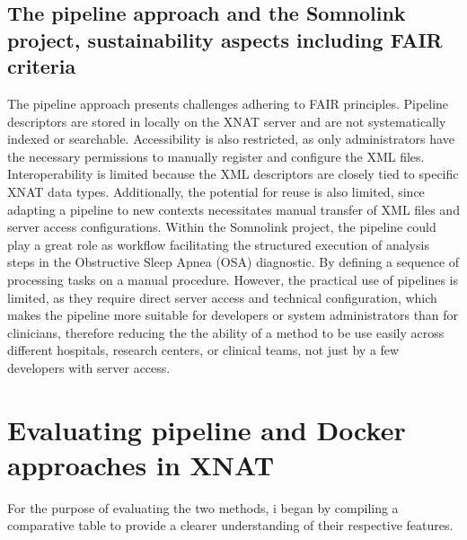 \subsection{The pipeline approach and the Somnolink project, sustainability aspects including FAIR criteria}
The pipeline approach presents challenges adhering to FAIR principles.
Pipeline descriptors are stored in locally on the XNAT server and are not systematically indexed or searchable.
 Accessibility is also restricted, as only administrators have the necessary permissions to manually register and configure the XML files.
 Interoperability is limited because the XML descriptors are closely tied to specific XNAT data types. Additionally, the potential for reuse is also limited, since adapting a pipeline to new contexts necessitates manual transfer of XML files and server access configurations. Within the Somnolink project, the pipeline could play a great role as workflow  facilitating the structured execution of analysis steps in the Obstructive Sleep Apnea (OSA) diagnostic. By defining a sequence of processing tasks on a manual procedure. However, the practical use of pipelines is limited, as they require direct server access and technical configuration, which makes the pipeline more suitable for developers or system administrators than for clinicians, therefore reducing the the ability of a method to be use easily across different hospitals, research centers, or clinical teams, not just by a few developers with server access.


\section{Evaluating pipeline and Docker approaches in XNAT}

For the purpose of evaluating the two methods, i began by compiling a comparative table to provide a clearer understanding of their respective features.

